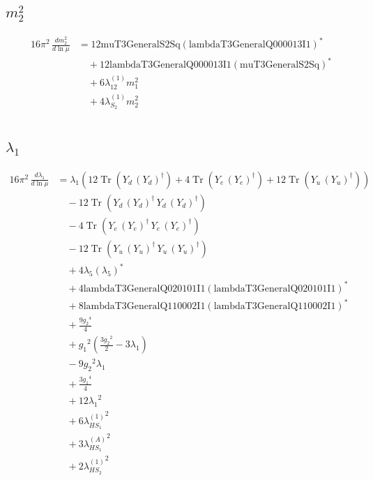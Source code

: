 \documentclass[10pt,a4paper]{article}
\begin{document}
\subsection*{$m_2^2$}
\begin{align*}
16\pi^2\,\frac{d m_2^2}{d\ln\mu} &=12 \text{muT3GeneralS2Sq} \left(\text{lambdaT3GeneralQ000013I1}\right)^{*} \\
&\quad +12 \text{lambdaT3GeneralQ000013I1} \left(\text{muT3GeneralS2Sq}\right)^{*} \\
&\quad +6 {\lambda_{12}^{(1)}} {m_1^2} \\
&\quad +4 {\lambda_{S_2}^{(1)}} {m_2^2} \\
\end{align*}
\subsection*{$\lambda_1$}
\begin{align*}
16\pi^2\,\frac{d \lambda_1}{d\ln\mu} &={\lambda_1} (12 \operatorname{Tr}\!\left({Y_d}\,\left({Y_d}\right)^{\dagger}\right)+4 \operatorname{Tr}\!\left({Y_e}\,\left({Y_e}\right)^{\dagger}\right)+12 \operatorname{Tr}\!\left({Y_u}\,\left({Y_u}\right)^{\dagger}\right)) \\
&\quad -12 \operatorname{Tr}\!\left({Y_d}\,\left({Y_d}\right)^{\dagger}\,{Y_d}\,\left({Y_d}\right)^{\dagger}\right) \\
&\quad -4 \operatorname{Tr}\!\left({Y_e}\,\left({Y_e}\right)^{\dagger}\,{Y_e}\,\left({Y_e}\right)^{\dagger}\right) \\
&\quad -12 \operatorname{Tr}\!\left({Y_u}\,\left({Y_u}\right)^{\dagger}\,{Y_u}\,\left({Y_u}\right)^{\dagger}\right) \\
&\quad +4 {\lambda_5} \left({\lambda_5}\right)^{*} \\
&\quad +4 \text{lambdaT3GeneralQ020101I1} \left(\text{lambdaT3GeneralQ020101I1}\right)^{*} \\
&\quad +8 \text{lambdaT3GeneralQ110002I1} \left(\text{lambdaT3GeneralQ110002I1}\right)^{*} \\
&\quad +\frac{9 {g_2}^4}{4} \\
&\quad +{g_1}^2 \left(\frac{3 {g_2}^2}{2}-3 {\lambda_1}\right) \\
&\quad -9 {g_2}^2 {\lambda_1} \\
&\quad +\frac{3 {g_1}^4}{4} \\
&\quad +12 {\lambda_1}^2 \\
&\quad +6 {\lambda_{HS_1}^{(1)}}^2 \\
&\quad +3 {\lambda_{HS_1}^{(A)}}^2 \\
&\quad +2 {\lambda_{HS_2}^{(1)}}^2 \\
\end{align*}
\end{document}
